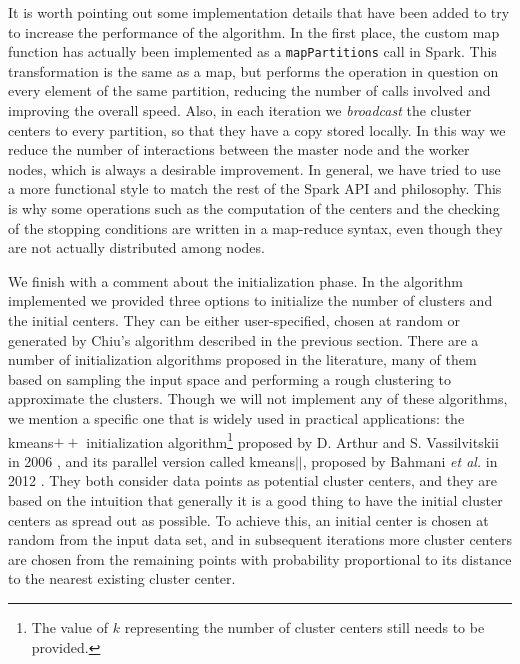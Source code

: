 It is worth pointing out some implementation details that have been added to try to increase the performance of the algorithm. In the first place, the custom map function has actually been implemented as a \verb|mapPartitions| call in Spark. This transformation is the same as a map, but performs the operation in question on every element of the same partition, reducing the number of calls involved and improving the overall speed. Also, in each iteration we \textit{broadcast} the cluster centers to every partition, so that they have a copy stored locally. In this way we reduce the number of interactions between the master node and the worker nodes, which is always a desirable improvement. In general, we have tried to use a more functional style to match the rest of the Spark API and philosophy. This is why some operations such as the computation of the centers and the checking of the stopping conditions are written in a map-reduce syntax, even though they are not actually distributed among nodes.

We finish with a comment about the initialization phase. In the algorithm implemented we provided three options to initialize the number of clusters and the initial centers. They can be either user-specified, chosen at random or generated by Chiu's algorithm described in the previous section. There are a number of initialization algorithms proposed in the literature, many of them based on sampling the input space and performing a rough clustering to approximate the clusters. Though we will not implement any of these algorithms, we mention a specific one that is widely used in practical applications: the kmeans$++$ initialization algorithm\footnote{The value of $k$ representing the number of cluster centers still needs to be provided.} proposed by D. Arthur and S. Vassilvitskii in 2006 \cite{arthur2006k}, and its parallel version called kmeans$||$, proposed by Bahmani \textit{et al.} in 2012 \cite{bahmani2012scalable}. They both consider data points as potential cluster centers, and they are based on the intuition that generally it is a good thing to have the initial cluster centers as spread out as possible. To achieve this, an initial center is chosen at random from the input data set, and in subsequent iterations more cluster centers are chosen from the remaining points with probability proportional to its distance to the nearest existing cluster center.
